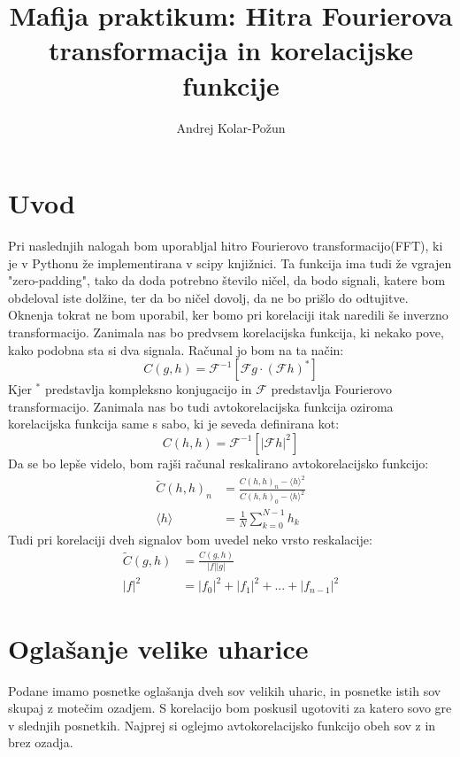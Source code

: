 \documentclass{article}
\title{Mafija praktikum: Hitra Fourierova transformacija in korelacijske funkcije}
\author{Andrej Kolar-Po{\v z}un}
\begin{document}
\maketitle
\newpage
{}

\section{Uvod}
Pri naslednjih nalogah bom uporabljal hitro Fourierovo transformacijo(FFT), ki je v Pythonu že implementirana v scipy knjižnici. Ta funkcija ima tudi že vgrajen "zero-padding", tako da doda potrebno število ničel,
da bodo signali, katere bom obdeloval iste dolžine, ter da bo ničel dovolj, da ne bo prišlo do odtujitve.
Oknenja tokrat ne bom uporabil, ker bomo pri korelaciji itak naredili še inverzno transformacijo.
Zanimala nas bo predvsem korelacijska funkcija, ki nekako pove, kako podobna sta si dva signala. Računal jo bom na ta način:
\begin{equation*}
C(g,h) = \mathcal{F}^{-1}[\mathcal{F}g \cdot (\mathcal{F}h)^*]
\end{equation*} 
Kjer $^*$ predstavlja kompleksno konjugacijo in $\mathcal{F}$ predstavlja Fourierovo transformacijo.
Zanimala nas bo tudi avtokorelacijska funkcija oziroma korelacijska funkcija same s sabo, ki je seveda definirana kot:
\begin{equation*}
C(h,h) = \mathcal{F}^{-1}[|\mathcal{F}h|^2]
\end{equation*}
Da se bo lepše videlo, bom rajši računal reskalirano avtokorelacijsko funkcijo:
\begin{align*}
\widetilde{C}(h,h)_n &= \frac{C(h,h)_n-\langle h\rangle ^2}{C(h,h)_0-\langle h\rangle ^2} \\
\langle h\rangle &= \frac{1}{N} \sum_{k=0}^{N-1} h_k
\end{align*}
Tudi pri korelaciji dveh signalov bom uvedel neko vrsto reskalacije:
\begin{align*}
\widetilde{C}(g,h) &= \frac{C(g,h)}{|f| |g|} \\
|f|^2 &= |f_0|^2 + |f_1|^2 + ... + |f_{n-1}|^2
\end{align*}

\section{Oglašanje velike uharice}

Podane imamo posnetke oglašanja dveh sov velikih uharic, in posnetke istih sov skupaj z motečim ozadjem. 
S korelacijo bom poskusil ugotoviti za katero sovo gre v slednjih posnetkih.
Najprej si oglejmo avtokorelacijsko funkcijo obeh sov z in brez ozadja.
\end{document}
